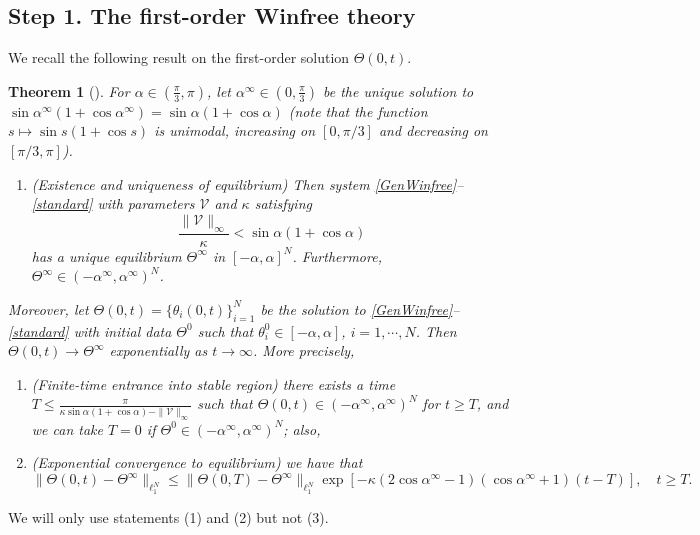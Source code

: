 \documentclass[11pt,reqno]{amsart}
\newcounter{name}
\newtheorem{theorem}[lemma]{Theorem}
\theoremstyle{definition}
\theoremstyle{remark}
\begin{document}
\subsection{Step 1. The first-order Winfree theory}
We recall the following result on the first-order solution $\Theta(0,t)$.
\begin{theorem}[{\cite[special case of Theorem 2.2]{ha2015emergence}}]\label{thm:HPR}
	For $\alpha\in \left(\frac{\pi}{3},\pi\right)$, let $\alpha^\infty\in \left(0,\frac{\pi}{3}\right)$ be the unique solution to $\sin\alpha^\infty(1+\cos\alpha^\infty)=\sin\alpha(1+\cos\alpha)$ (note that the function $s\mapsto \sin s(1+\cos s)$ is unimodal, increasing on $[0,\pi/3]$ and decreasing on $[\pi/3,\pi]$).
	
	\begin{enumerate}
		\item (Existence and uniqueness of equilibrium) Then system \eqref{GenWinfree}--\eqref{standard} with parameters $\mathcal{V}$ and $\kappa$ satisfying
		\[
		\frac{\|\mathcal{V}\|_\infty}{\kappa}<\sin\alpha(1+\cos\alpha)
		\]
		has a unique equilibrium $\Theta^\infty$ in $[-\alpha,\alpha]^N$.
		Furthermore, $\Theta^\infty\in (-\alpha^\infty,\alpha^\infty)^N$.
		\setcounter{name}{\value{enumi}}
	\end{enumerate}
	Moreover, let $\Theta(0,t)=\{\theta_i(0,t)\}_{i=1}^N$ be the solution to \eqref{GenWinfree}--\eqref{standard} with initial data $\Theta^0$ such that $\theta_i^0\in [-\alpha,\alpha]$, $i=1,\cdots,N$. Then $\Theta(0,t)\to \Theta^\infty$ exponentially as $t\to\infty$. More precisely,
	\begin{enumerate}
		\setcounter{enumi}{\value{name}}
		\item (Finite-time entrance into stable region) there exists a time $T\le \frac{\pi}{\kappa\sin\alpha(1+\cos\alpha)-\|\mathcal{V}\|_\infty}$ such that $\Theta(0,t)\in (-\alpha^\infty,\alpha^\infty)^N$ for $t\ge T$, and we can take $T=0$ if $\Theta^0\in (-\alpha^\infty,\alpha^\infty)^N$; also,
		\item (Exponential convergence to equilibrium) we have that
		\[
		\|\Theta(0,t)-\Theta^\infty\|_{\ell_1^N}\le \|\Theta(0,T)-\Theta^\infty\|_{\ell_1^N}\exp\left[-\kappa (2\cos\alpha^\infty-1)(\cos\alpha^\infty+1)(t-T)\right],\quad t\ge T.
		\]
	\end{enumerate}
\end{theorem}
We will only use statements (1) and (2) but not (3).
\end{document}
